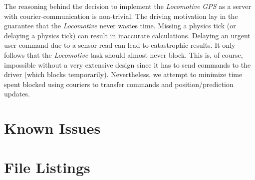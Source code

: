 \documentclass[twoside,a4paper]{refart}
\begin{document}
The reasoning behind the decision to implement the \textit{Locomotive GPS} as a server with courier-communication is non-trivial. The driving motivation lay in the guarantee that the \textit{Locomotive} never wastes time. Missing a physics tick (or delaying a physics tick) can result in inaccurate calculations. Delaying an urgent user command due to a sensor read can lead to catastrophic results. It only follows that the \textit{Locomotive} task should almost never block. This is, of course, impossible without a very extensive design since it has to send commands to the driver (which blocks temporarily). Nevertheless, we attempt to minimize time spent blocked using couriers to transfer commands and position/prediction updates.

\section{Known Issues}
\section{File Listings}

\printindex
\end{document}
